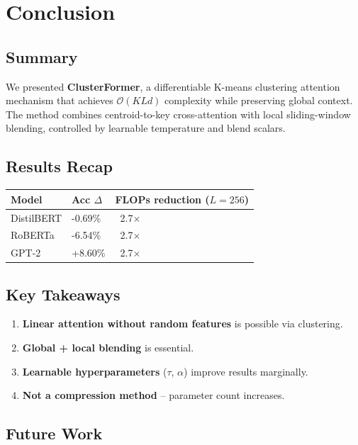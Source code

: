 \section{Conclusion}

\subsection{Summary}

We presented \textbf{ClusterFormer}, a differentiable K-means clustering 
attention mechanism that achieves $\mathcal{O}(KLd)$ complexity while 
preserving global context. The method combines centroid-to-key 
cross-attention with local sliding-window blending, controlled by learnable 
temperature and blend scalars.

\subsection{Results Recap}

\begin{table}[H]
\centering
\small
\begin{tabular}{lll}
\toprule
\textbf{Model} & \textbf{Acc $\Delta$} & \textbf{FLOPs reduction ($L=256$)} \\
\midrule
DistilBERT & -0.69\% & ~2.7$\times$ \\
RoBERTa & -6.54\% & ~2.7$\times$ \\
GPT-2 & +8.60\% & ~2.7$\times$ \\
\bottomrule
\end{tabular}
\end{table}

\subsection{Key Takeaways}

\begin{enumerate}
\item \textbf{Linear attention without random features} is possible via clustering.
\item \textbf{Global + local blending} is essential.
\item \textbf{Learnable hyperparameters} ($\tau$, $\alpha$) improve results marginally.
\item \textbf{Not a compression method} -- parameter count increases.

\end{enumerate}
\subsection{Future Work}

